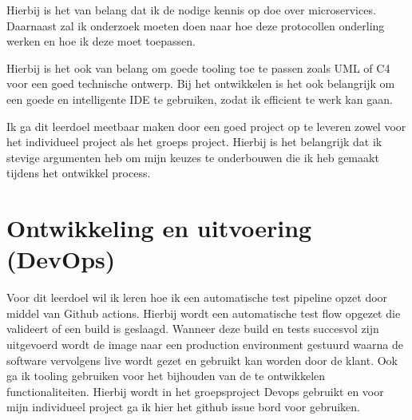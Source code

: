 Hierbij is het van belang dat ik de nodige kennis op doe over microservices.
Daarnaast zal ik onderzoek moeten doen naar hoe deze protocollen onderling werken en hoe ik deze moet toepassen.

Hierbij is het ook van belang om goede tooling toe te passen zoals UML of C4 voor een goed technische ontwerp.
Bij het ontwikkelen is het ook belangrijk om een goede en intelligente IDE te gebruiken, zodat ik efficient te werk
kan gaan.

Ik ga dit leerdoel meetbaar maken door een goed project op te leveren zowel voor het individueel project als het
groeps project.
Hierbij is het belangrijk dat ik stevige argumenten heb om mijn keuzes te onderbouwen die ik heb gemaakt tijdens
het ontwikkel process.


\section{Ontwikkeling en uitvoering (DevOps)}\label{sec:ontwikkeling-en-uitvoering-(devops)}


Voor dit leerdoel wil ik leren hoe ik een automatische test pipeline opzet door middel van Github actions.
Hierbij wordt een automatische test flow opgezet die valideert of een build is geslaagd.
Wanneer deze build en tests succesvol zijn uitgevoerd wordt de image naar een production environment gestuurd waarna
de software vervolgens live wordt gezet en gebruikt kan worden door de klant.
Ook ga ik tooling gebruiken voor het bijhouden van de te ontwikkelen functionaliteiten. Hierbij wordt in het
groepsproject Devops gebruikt en voor mijn individueel project ga ik hier het github issue bord voor gebruiken.


